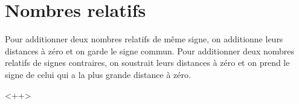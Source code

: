 


\section{Nombres relatifs}

\begin{propriete}
Pour additionner deux nombres relatifs de même signe, on additionne leurs
distances à zéro et on garde le signe commun.
Pour additionner deux nombres relatifs de signes contraires, on soustrait leurs
distances à zéro et on prend le signe de celui qui a la plus grande distance à zéro.
\end{propriete}
<++>

